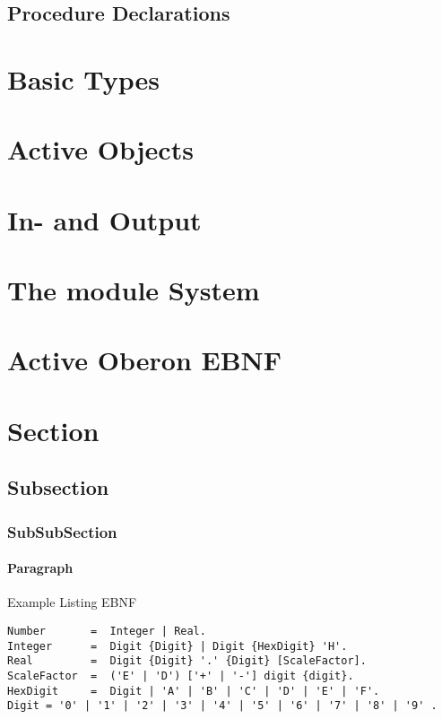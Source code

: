 \documentclass[a4paper,11pt]{article}
\begin{document}
\subsection{Procedure Declarations}

\section{Basic Types}

\section{Active Objects}

\section{In- and Output}

\section{The module System}

\section{Active Oberon EBNF}



\section{Section}
\subsection{Subsection}
\subsubsection{SubSubSection}
\paragraph{Paragraph}

Example Listing EBNF
\begin{lstlisting}[language=ebnf]
Number       =  Integer | Real.
Integer      =  Digit {Digit} | Digit {HexDigit} 'H'.
Real         =  Digit {Digit} '.' {Digit} [ScaleFactor].
ScaleFactor  =  ('E' | 'D') ['+' | '-'] digit {digit}.
HexDigit     =  Digit | 'A' | 'B' | 'C' | 'D' | 'E' | 'F'.
Digit = '0' | '1' | '2' | '3' | '4' | '5' | '6' | '7' | '8' | '9' .
\end{lstlisting}
\end{document}
